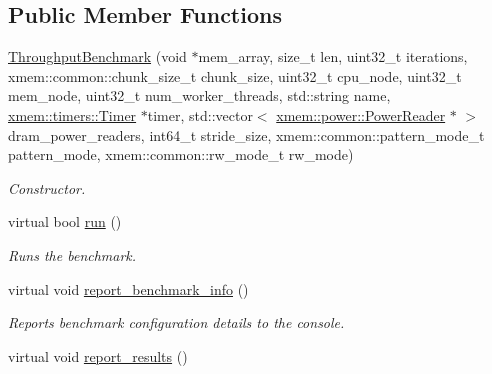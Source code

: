 \subsection*{Public Member Functions}
\begin{DoxyCompactItemize}
\item 
\hyperlink{classxmem_1_1benchmark_1_1_throughput_benchmark_a7f6fcc030500ebd3aed37d7eacea68dc}{Throughput\+Benchmark} (void $\ast$mem\+\_\+array, size\+\_\+t len, uint32\+\_\+t iterations, xmem\+::common\+::chunk\+\_\+size\+\_\+t chunk\+\_\+size, uint32\+\_\+t cpu\+\_\+node, uint32\+\_\+t mem\+\_\+node, uint32\+\_\+t num\+\_\+worker\+\_\+threads, std\+::string name, \hyperlink{classxmem_1_1timers_1_1_timer}{xmem\+::timers\+::\+Timer} $\ast$timer, std\+::vector$<$ \hyperlink{classxmem_1_1power_1_1_power_reader}{xmem\+::power\+::\+Power\+Reader} $\ast$ $>$ dram\+\_\+power\+\_\+readers, int64\+\_\+t stride\+\_\+size, xmem\+::common\+::pattern\+\_\+mode\+\_\+t pattern\+\_\+mode, xmem\+::common\+::rw\+\_\+mode\+\_\+t rw\+\_\+mode)
\begin{DoxyCompactList}\small\item\em Constructor. \end{DoxyCompactList}\item 
virtual bool \hyperlink{classxmem_1_1benchmark_1_1_throughput_benchmark_a9f113e51d980830582148eb05c8810a3}{run} ()
\begin{DoxyCompactList}\small\item\em Runs the benchmark. \end{DoxyCompactList}\item 
\hypertarget{classxmem_1_1benchmark_1_1_throughput_benchmark_aab821d4beb68616c5a939bc2e493426e}{}virtual void \hyperlink{classxmem_1_1benchmark_1_1_throughput_benchmark_aab821d4beb68616c5a939bc2e493426e}{report\+\_\+benchmark\+\_\+info} ()\label{classxmem_1_1benchmark_1_1_throughput_benchmark_aab821d4beb68616c5a939bc2e493426e}

\begin{DoxyCompactList}\small\item\em Reports benchmark configuration details to the console. \end{DoxyCompactList}\item 
\hypertarget{classxmem_1_1benchmark_1_1_throughput_benchmark_a7df909bd544d1399e756a98bfbce2561}{}virtual void \hyperlink{classxmem_1_1benchmark_1_1_throughput_benchmark_a7df909bd544d1399e756a98bfbce2561}{report\+\_\+results} ()\label{classxmem_1_1benchmark_1_1_throughput_benchmark_a7df909bd544d1399e756a98bfbce2561}


\end{DoxyCompactItemize}
